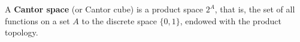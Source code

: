 A \textbf{Cantor space} (or Cantor cube) is a product space $2^A$, that is, the set of all functions on a set $A$ to the discrete space $\{0,1\}$, endowed with the product topology.
